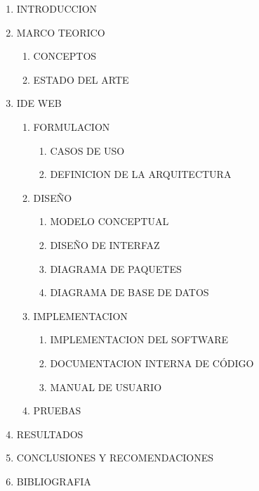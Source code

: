 \documentclass[12pt,letterpaper,oneside]{article}
\begin{document}
\begin{enumerate}
\item INTRODUCCION
\item MARCO TEORICO

\begin{enumerate}
\item CONCEPTOS
\item ESTADO DEL ARTE
\end{enumerate}
\item IDE WEB

\begin{enumerate}
\item FORMULACION

\begin{enumerate}
\item CASOS DE USO
\item DEFINICION DE LA ARQUITECTURA
\end{enumerate}
\item DISEÑO

\begin{enumerate}
\item MODELO CONCEPTUAL
\item DISEÑO DE INTERFAZ
\item DIAGRAMA DE PAQUETES
\item DIAGRAMA DE BASE DE DATOS
\end{enumerate}
\item IMPLEMENTACION

\begin{enumerate}
\item IMPLEMENTACION DEL SOFTWARE
\item DOCUMENTACION INTERNA DE C\'ODIGO
\item MANUAL DE USUARIO
\end{enumerate}
\item PRUEBAS
\end{enumerate}
\item RESULTADOS
\item CONCLUSIONES Y RECOMENDACIONES
\item BIBLIOGRAFIA
\end{enumerate}

\bigskip


\bigskip


\bigskip


\bigskip


\bigskip


\bigskip


\bigskip
\end{document}
